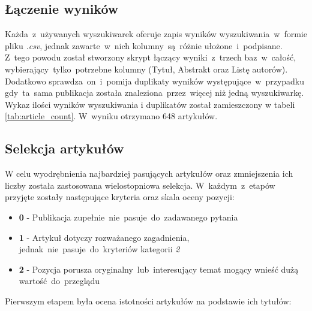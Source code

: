 \subsection{Łączenie wyników}
Każda~z~używanych wyszukiwarek oferuje zapis wyników wyszukiwania~w~formie pliku {\it .csv}, jednak zawarte~w~nich kolumny~są~różnie ułożone~i~podpisane. Z~tego powodu został stworzony skrypt łączący wyniki~z~trzech baz~w~całość, wybierający~tylko~potrzebne kolumny (Tytuł, Abstrakt oraz Listę autorów). Dodatkowo sprawdza~on~i~pomija duplikaty wyników występujące~w~przypadku gdy~ta~sama publikacja została znaleziona~przez~więcej niż jedną wyszukiwarkę. Wykaz ilości wyników wyszukiwania i duplikatów został zamieszczony w tabeli \ref{tab:article_count}. W~wyniku otrzymano 648 artykułów.

\subsection{Selekcja artykułów}
W celu wyodrębnienia najbardziej pasujących artykułów oraz zmniejszenia ich liczby została zastosowana wielostopniowa selekcja. W~każdym~z~etapów przyjęte zostały następujące kryteria oraz skala oceny pozycji:
\begin{itemize}
    \item {\bf 0} - Publikacja zupełnie~nie~pasuje~do~zadawanego pytania
    \item {\bf 1} - Artykuł dotyczy rozważanego zagadnienia, jednak~nie~pasuje~do~kryteriów kategorii {\it 2}
    \item {\bf 2} - Pozycja porusza oryginalny~lub~interesujący temat mogący wnieść dużą wartość~do~przeglądu
\end{itemize}

\noindent Pierwszym etapem była ocena istotności artykułów na podstawie ich tytułów:

